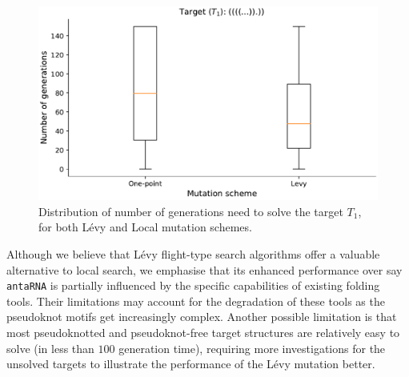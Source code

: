 \begin{figure}[H]
	\includegraphics[width=1.0\linewidth]{../res/images/aRNAque/Target1.pdf}
	\caption{Distribution of number of generations need to solve the target $T_1$, for both Lévy and Local mutation schemes. }
	\label{fig:target1}
\end{figure}
Although we believe that Lévy flight-type search algorithms offer a valuable alternative to local search, we emphasise that its enhanced performance over say \texttt{antaRNA} is partially influenced by the specific capabilities of existing folding tools. Their limitations may account for the degradation of these tools as the pseudoknot motifs get increasingly complex. Another possible limitation is that most pseudoknotted and pseudoknot-free target structures are relatively easy to solve (in less than $100$ generation time), requiring more investigations for the unsolved targets to illustrate the performance of the Lévy mutation better.


